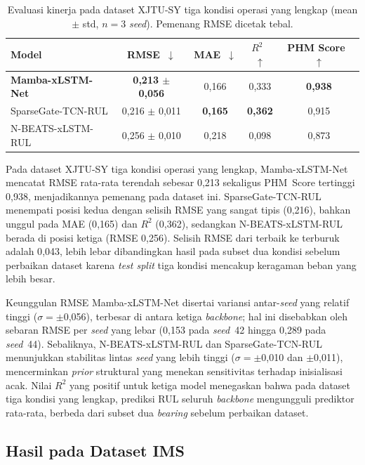 \begin{table}[ht]
\centering
\caption{Evaluasi kinerja pada dataset XJTU-SY tiga kondisi operasi yang
         lengkap (mean $\pm$ std, $n = 3$ \emph{seed}). Pemenang RMSE
         dicetak tebal.}
\label{tab:bab5_xjtusy}
\small
\begin{tabular}{@{}lcccc@{}}
\toprule
\textbf{Model} & \textbf{RMSE~$\downarrow$} & \textbf{MAE~$\downarrow$}
  & \textbf{$R^2$~$\uparrow$} & \textbf{PHM Score~$\uparrow$} \\
\midrule
\textbf{Mamba-xLSTM-Net}     & \textbf{0{,}213 $\pm$ 0{,}056}
  & 0{,}166 & 0{,}333 & \textbf{0{,}938} \\
SparseGate-TCN-RUL           & 0{,}216 $\pm$ 0{,}011 & \textbf{0{,}165}
  & \textbf{0{,}362} & 0{,}915 \\
N-BEATS-xLSTM-RUL            & 0{,}256 $\pm$ 0{,}010 & 0{,}218
  & 0{,}098 & 0{,}873 \\
\bottomrule
\end{tabular}
\end{table}

Pada dataset XJTU-SY tiga kondisi operasi yang lengkap, Mamba-xLSTM-Net
mencatat RMSE rata-rata terendah sebesar 0{,}213 sekaligus PHM~Score
tertinggi 0{,}938, menjadikannya pemenang pada dataset ini.
SparseGate-TCN-RUL menempati posisi kedua dengan selisih RMSE yang sangat
tipis (0{,}216), bahkan unggul pada MAE (0{,}165) dan $R^2$ (0{,}362),
sedangkan N-BEATS-xLSTM-RUL berada di posisi ketiga (RMSE 0{,}256).
Selisih RMSE dari terbaik ke terburuk adalah 0{,}043, lebih lebar
dibandingkan hasil pada subset dua kondisi sebelum perbaikan dataset karena
\emph{test split} tiga kondisi mencakup keragaman beban yang lebih besar.

Keunggulan RMSE Mamba-xLSTM-Net disertai variansi antar-\emph{seed} yang
relatif tinggi ($\sigma = \pm$0{,}056), terbesar di antara ketiga
\emph{backbone}; hal ini disebabkan oleh sebaran RMSE per \emph{seed}
yang lebar (0{,}153 pada \emph{seed}~42 hingga 0{,}289 pada \emph{seed}~44).
Sebaliknya, N-BEATS-xLSTM-RUL dan SparseGate-TCN-RUL menunjukkan stabilitas
lintas \emph{seed} yang lebih tinggi ($\sigma = \pm$0{,}010 dan
$\pm$0{,}011), mencerminkan \emph{prior} struktural yang menekan sensitivitas
terhadap inisialisasi acak. Nilai $R^2$ yang positif untuk ketiga model
menegaskan bahwa pada dataset tiga kondisi yang lengkap, prediksi RUL
seluruh \emph{backbone} mengungguli prediktor rata-rata, berbeda dari subset
dua \emph{bearing} sebelum perbaikan dataset.

\subsection{Hasil pada Dataset IMS}
\label{subsec:bab5_ims_rul}

